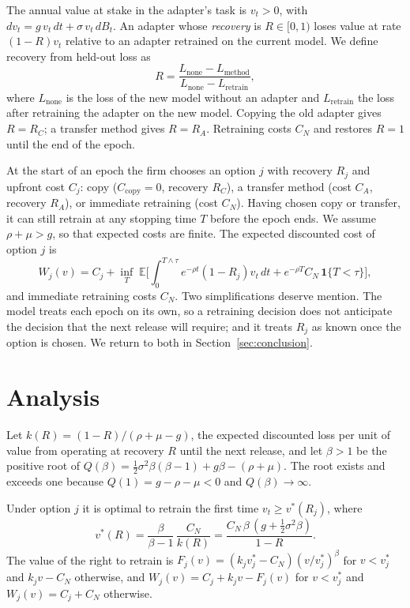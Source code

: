 \documentclass[ijds,blindrev]{informs4}
\newcommand{\E}{\mathbb{E}}
\begin{document}
The annual value at stake in the adapter's task is $v_t>0$, with $dv_t=g\,v_t\,dt+\sigma\,v_t\,dB_t$. An adapter whose \emph{recovery} is $R\in[0,1)$ loses value at rate $(1-R)v_t$ relative to an adapter retrained on the current model. We define recovery from held-out loss as
\begin{equation}\label{eq:recovery}
R=\frac{L_{\text{none}}-L_{\text{method}}}{L_{\text{none}}-L_{\text{retrain}}},
\end{equation}
where $L_{\text{none}}$ is the loss of the new model without an adapter and $L_{\text{retrain}}$ the loss after retraining the adapter on the new model. Copying the old adapter gives $R=R_C$; a transfer method gives $R=R_A$. Retraining costs $C_N$ and restores $R=1$ until the end of the epoch.

At the start of an epoch the firm chooses an option $j$ with recovery $R_j$ and upfront cost $C_j$: copy ($C_{\text{copy}}=0$, recovery $R_C$), a transfer method (cost $C_A$, recovery $R_A$), or immediate retraining (cost $C_N$). Having chosen copy or transfer, it can still retrain at any stopping time $T$ before the epoch ends. We assume $\rho+\mu>g$, so that expected costs are finite. The expected discounted cost of option $j$ is
\begin{equation}\label{eq:W}
W_j(v)=C_j+\inf_{T}\;\E\Big[\int_0^{T\wedge\tau}e^{-\rho t}(1-R_j)v_t\,dt+e^{-\rho T}C_N\,\mathbf 1\{T<\tau\}\Big],
\end{equation}
and immediate retraining costs $C_N$. Two simplifications deserve mention. The model treats each epoch on its own, so a retraining decision does not anticipate the decision that the next release will require; and it treats $R_j$ as known once the option is chosen. We return to both in Section~\ref{sec:conclusion}.

\section{Analysis}\label{sec:analysis}

Let $k(R)=(1-R)/(\rho+\mu-g)$, the expected discounted loss per unit of value from operating at recovery $R$ until the next release, and let $\beta>1$ be the positive root of $Q(\beta)=\tfrac12\sigma^2\beta(\beta-1)+g\beta-(\rho+\mu)$. The root exists and exceeds one because $Q(1)=g-\rho-\mu<0$ and $Q(\beta)\to\infty$.

\begin{proposition}\label{prop:thr}
Under option $j$ it is optimal to retrain the first time $v_t\ge v^*(R_j)$, where
\begin{equation}\label{eq:vstar}
v^*(R)=\frac{\beta}{\beta-1}\,\frac{C_N}{k(R)}=\frac{C_N\,\beta\,(g+\tfrac12\sigma^2\beta)}{1-R}.
\end{equation}
The value of the right to retrain is $F_j(v)=(k_jv^*_j-C_N)(v/v^*_j)^\beta$ for $v<v^*_j$ and $k_jv-C_N$ otherwise, and $W_j(v)=C_j+k_jv-F_j(v)$ for $v<v^*_j$ and $W_j(v)=C_j+C_N$ otherwise.
\end{proposition}
\end{document}
